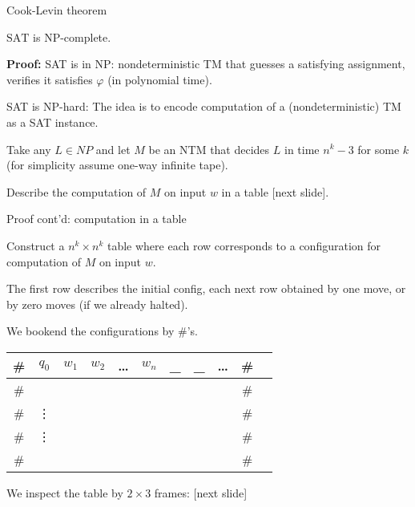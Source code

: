 \documentclass[handout]{beamer}
\begin{document}
    
\begin{frame}{Cook-Levin theorem}
    
    \begin{theorem}
        $\mathrm{SAT}$ is $\mathrm{NP}$-complete.
    \end{theorem}


    \textbf{Proof:} \alert{SAT is in NP:} nondeterministic TM that guesses a satisfying assignment, verifies it satisfies $\varphi$ (in polynomial time).

    \bigskip

    \alert{SAT is NP-hard:} The idea is to encode computation of a (nondeterministic) TM as a SAT instance.

    Take any $L\in NP$ and let $M$ be an NTM that decides $L$ in time $n^k-3$ for some $k$ (for simplicity assume one-way infinite tape).

    Describe the computation of $M$ on input $w$ in a table [next slide].

\end{frame}


\begin{frame}{Proof cont'd: computation in a table}

    Construct a $n^k\times n^k$ table where each row corresponds to a configuration for computation of $M$ on input $w$.  
    
    The first row describes the initial config, each next row obtained by one move, or by zero moves (if we already halted).

    We bookend the configurations by \#'s.

    \begin{center}
        \begin{tabular}{|c|c|c|c|c|c|c|c|c|c|c|}\hline
            \# & $q_0$ & $w_1$ &$w_2$ & \ldots &$w_n$ & \_  &\_  &  \ldots &\# \\\hline
            \# &       &       &       &       &       &       &       &  &\# \\\hline
            \# & \vdots &       &       &       &       &       &       &&\# \\
            \# & \vdots &       &       &       &       &       &       &&\# \\\hline
            \# &       &       &       &       &       &       &       &  &\# \\\hline
                
        \end{tabular}
    \end{center}

    We inspect the table by $2\times 3$ frames:
    [next slide]

\end{frame}
\end{document}

